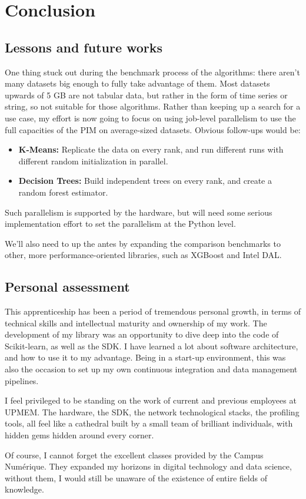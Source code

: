 \chapter{Conclusion}
\label{chapter:conclusion}

\section{Lessons and future works}

One thing stuck out during the benchmark process of the algorithms: there aren't many datasets big enough to fully take advantage of them. Most datasets upwards of 5 GB are not tabular data, but rather in the form of time series or string, so not suitable for those algorithms. Rather than keeping up a search for a use case, my effort is now going to focus on using job-level parallelism to use the full capacities of the PIM on average-sized datasets. Obvious follow-ups would be:
\begin{itemize}
    \item \textbf{K-Means:} Replicate the data on every rank, and run different runs with different random initialization in parallel.
    \item \textbf{Decision Trees:} Build independent trees on every rank, and create a random forest estimator.
\end{itemize}
Such parallelism is supported by the hardware, but will need some serious implementation effort to set the parallelism at the Python level.

We'll also need to up the antes by expanding the comparison benchmarks to other, more performance-oriented libraries, such as XGBoost and Intel DAL.

\section{Personal assessment}

This apprenticeship has been a period of tremendous personal growth, in terms of technical skills and intellectual maturity and ownership of my work. The development of my library was an opportunity to dive deep into the code of Scikit-learn, as well as the SDK. I have learned a lot about software architecture, and how to use it to my advantage. Being in a start-up environment, this was also the occasion to set up my own continuous integration and data management pipelines.

I feel privileged to be standing on the work of current and previous employees at UPMEM. The hardware, the SDK, the network technological stacks, the profiling tools, all feel like a cathedral built by a small team of brilliant individuals, with hidden gems hidden around every corner.

Of course, I cannot forget the excellent classes provided by the Campus Numérique. They expanded my horizons in digital technology and data science, without them, I would still be unaware of the existence of entire fields of knowledge.